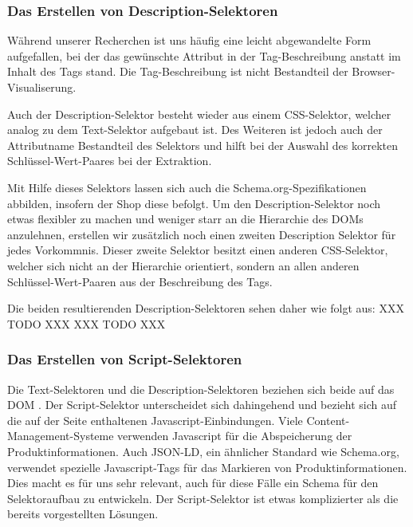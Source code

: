 \subsubsection{Das Erstellen von Description-Selektoren}
\label{subsubsec:erstellen-von-description-selektoren}

Während unserer Recherchen ist uns häufig eine leicht abgewandelte Form aufgefallen, bei der das gewünschte Attribut
in der Tag-Beschreibung anstatt im Inhalt des Tags stand.
Die Tag-Beschreibung ist nicht Bestandteil der Browser-Visualiserung.

Auch der Description-Selektor besteht wieder aus einem CSS-Selektor, welcher analog zu dem Text-Selektor aufgebaut ist.
Des Weiteren ist jedoch auch der Attributname Bestandteil des Selektors und hilft bei der Auswahl des korrekten
Schlüssel-Wert-Paares bei der Extraktion.

Mit Hilfe dieses Selektors lassen sich auch die Schema.org-Spezifikationen abbilden, insofern der Shop diese befolgt.
Um den Description-Selektor noch etwas flexibler zu machen und weniger starr an die Hierarchie des DOMs anzulehnen,
erstellen wir zusätzlich noch einen zweiten Description Selektor für jedes Vorkommnis.
Dieser zweite Selektor besitzt einen anderen CSS-Selektor, welcher sich nicht an der Hierarchie orientiert, sondern
an allen anderen Schlüssel-Wert-Paaren aus der Beschreibung des Tags.

Die beiden resultierenden Description-Selektoren sehen daher wie folgt aus:
XXX TODO XXX
XXX TODO XXX

\subsubsection{Das Erstellen von Script-Selektoren}
\label{subsubsec:erstellen-von-script-selektoren}

Die Text-Selektoren und die Description-Selektoren beziehen sich beide auf das DOM .
Der Script-Selektor unterscheidet sich dahingehend und bezieht sich auf die auf der Seite enthaltenen
Javascript-Einbindungen.
Viele Content-Management-Systeme verwenden Javascript für die Abspeicherung der Produktinformationen.
Auch JSON-LD, ein ähnlicher Standard wie Schema.org, verwendet spezielle Javascript-Tags für das Markieren von
Produktinformationen.
Dies macht es für uns sehr relevant, auch für diese Fälle ein Schema für den Selektoraufbau zu entwickeln.
Der Script-Selektor ist etwas komplizierter als die bereits vorgestellten Lösungen.

